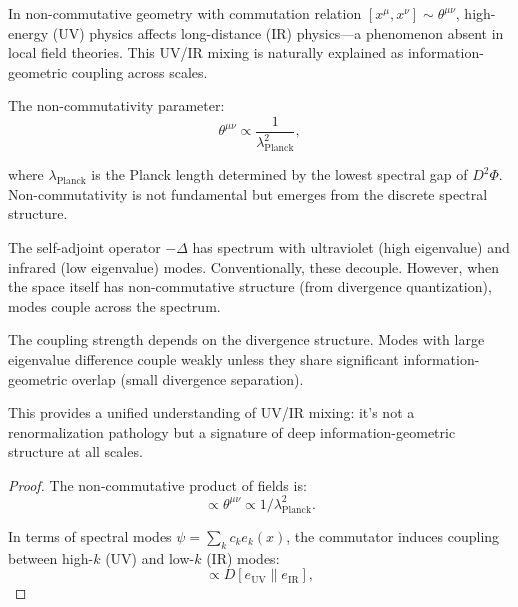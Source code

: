 \begin{theorem}
\label{thm:uvIrMixing}

In non-commutative geometry with commutation relation $[x^\mu, x^\nu] \sim \theta^{\mu\nu}$, high-energy (UV) physics affects long-distance (IR) physics---a phenomenon absent in local field theories. This UV/IR mixing is naturally explained as information-geometric coupling across scales.

\begin{definition}

The non-commutativity parameter:
\begin{equation}
\theta^{\mu\nu} \propto \frac{1}{\lambda_{\text{Planck}}^2},
\end{equation}

where $\lambda_{\text{Planck}}$ is the Planck length determined by the lowest spectral gap of $D^2\Phi$. Non-commutativity is not fundamental but emerges from the discrete spectral structure.

\end{definition}

\begin{theorem}
\label{thm:spectralCouplingAcrossScales}

The self-adjoint operator $-\Delta$ has spectrum with ultraviolet (high eigenvalue) and infrared (low eigenvalue) modes. Conventionally, these decouple. However, when the space itself has non-commutative structure (from divergence quantization), modes couple across the spectrum.

The coupling strength depends on the divergence structure. Modes with large eigenvalue difference couple weakly unless they share significant information-geometric overlap (small divergence separation).

This provides a unified understanding of UV/IR mixing: it's not a renormalization pathology but a signature of deep information-geometric structure at all scales.

\begin{proof}

The non-commutative product of fields is:
\begin{equation}
[\psi(x), \psi(y)] \propto \theta^{\mu\nu} \propto 1/\lambda_{\text{Planck}}^2.
\end{equation}

In terms of spectral modes $\psi = \sum_k c_k e_k(x)$, the commutator induces coupling between high-$k$ (UV) and low-$k$ (IR) modes:
\begin{equation}
[c_{\text{UV}}, c_{\text{IR}}] \propto D[e_{\text{UV}} \| e_{\text{IR}}],
\end{equation}


\end{proof}
\end{theorem}
\end{theorem}
